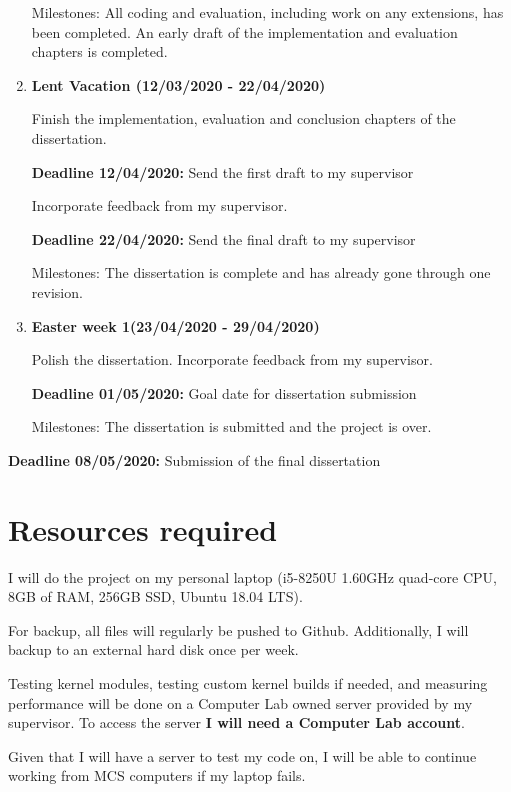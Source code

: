 \begin{enumerate}
            Milestones: All coding and evaluation, including work on any extensions, has been completed. An early draft
            of the implementation and evaluation chapters is completed.

        \item {\bf Lent Vacation (12/03/2020 - 22/04/2020)}

            Finish the implementation, evaluation and conclusion chapters of the dissertation.

            {\bf Deadline 12/04/2020:} Send the first draft to my supervisor

            Incorporate feedback from my supervisor.

            {\bf Deadline 22/04/2020:} Send the final draft to my supervisor

            Milestones: The dissertation is complete and has already gone through one revision.

        \item {\bf Easter week 1(23/04/2020 - 29/04/2020)} 

            Polish the dissertation. Incorporate feedback from my supervisor.

            {\bf Deadline 01/05/2020:} Goal date for dissertation submission

            Milestones: The dissertation is submitted and the project is over.

    \end{enumerate}
    {\bf Deadline 08/05/2020:} Submission of the final dissertation

\section*{Resources required}

    I will do the project on my personal laptop (i5-8250U 1.60GHz quad-core CPU, 8GB of RAM, 256GB SSD, Ubuntu 18.04 LTS).
    
    For backup, all files will regularly be pushed to Github. Additionally, I will backup to an external hard disk
    once per week.

    Testing kernel modules, testing custom kernel builds if needed, and measuring performance will be done on 
    a Computer Lab owned server provided by my supervisor. To access the server {\bf I will need a Computer Lab account}.

    Given that I will have a server to test my code on, I will be able to continue working from MCS computers if my laptop fails.
